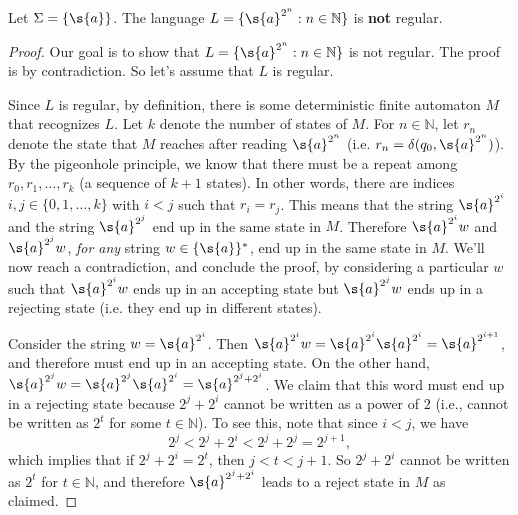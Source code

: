 \begin{flex}
\label{grp:grm:deterministic-finite-automata::unary}

\begin{gram}
\label{grm:deterministic-finite-automata::unary}
\begin{theorem} \label{theorem:A-unary-non-regular-language}
Let $\Sigma = \{\s{a}\}$. The language $L = \{\s{a}^{2^n}: n \in \mathbb{N}\}$ is \textbf{not} regular.
\end{theorem}
\begin{proof}
Our goal is to show that $L = \{\s{a}^{2^n}: n \in \mathbb{N}\}$ is not regular. The proof is by contradiction. So let's assume that $L$ is regular. 

Since $L$ is regular, by definition, there is some deterministic finite automaton $M$ that recognizes $L$. Let $k$ denote the number of states of $M$. For $n \in \mathbb{N}$, let $r_n$ denote the state that $M$ reaches after reading $\s{a}^{2^n}$ (i.e. $r_n = \delta(q_0, \s{a}^{2^n})$). By the pigeonhole principle, we know that there must be a repeat among $r_0, r_1,\ldots, r_k$ (a sequence of $k+1$ states). In other words, there are indices $i, j \in \{0,1,\ldots,k\}$ with $i < j$ such that $r_i = r_j$. This means that the string $\s{a}^{2^i}$ and the string $\s{a}^{2^j}$ end up in the same state in $M$. Therefore $\s{a}^{2^i}w$ and $\s{a}^{2^j}w$, \emph{for any} string $w \in \{\s{a}\}^*$, end up in the same state in $M$. We'll now reach a contradiction, and conclude the proof, by considering a particular $w$ such that $\s{a}^{2^i}w$ ends up in an accepting state but $\s{a}^{2^j}w$ ends up in a rejecting state (i.e. they end up in different states). 

Consider the string $w = \s{a}^{2^i}$. Then $\s{a}^{2^i}w = \s{a}^{2^i}\s{a}^{2^i} = \s{a}^{2^{i+1}}$, and therefore must end up in an accepting state. On the other hand, $\s{a}^{2^j}w = \s{a}^{2^j}\s{a}^{2^i} = \s{a}^{2^j + 2^i}$. We claim that this word must end up in a rejecting state because $2^j + 2^i$ cannot be written as a power of $2$ (i.e., cannot be written as $2^t$ for some $t \in \mathbb{N}$). To see this, note that since $i < j$, we have
\[
2^j < 2^j + 2^i < 2^j + 2^j = 2^{j+1},
\]
which implies that if $2^j + 2^i = 2^t$, then $j < t < j+1$. So $2^j + 2^i$ cannot be written as $2^t$ for $t \in \mathbb{N}$, and therefore $\s{a}^{2^j + 2^i}$ leads to a reject state in $M$ as claimed.
\end{proof}

\end{gram}
\end{flex}

